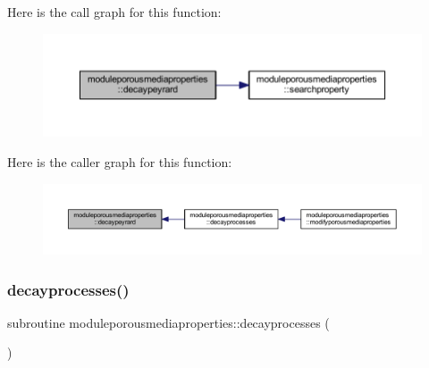 Here is the call graph for this function\+:\nopagebreak
\begin{figure}[H]
\begin{center}
\leavevmode
\includegraphics[width=350pt]{namespacemoduleporousmediaproperties_a9e4d029f1da0a9fa9ea00b76a2a21ffd_cgraph}
\end{center}
\end{figure}
Here is the caller graph for this function\+:\nopagebreak
\begin{figure}[H]
\begin{center}
\leavevmode
\includegraphics[width=350pt]{namespacemoduleporousmediaproperties_a9e4d029f1da0a9fa9ea00b76a2a21ffd_icgraph}
\end{center}
\end{figure}
\mbox{\label{namespacemoduleporousmediaproperties_a09a5fbeb9b55249ae5b934510525a8ff}} 
\subsubsection{\texorpdfstring{decayprocesses()}{decayprocesses()}}
{\footnotesize\ttfamily subroutine moduleporousmediaproperties\+::decayprocesses (\begin{DoxyParamCaption}{ }\end{DoxyParamCaption})\hspace{0.3cm}{\ttfamily [private]}}

